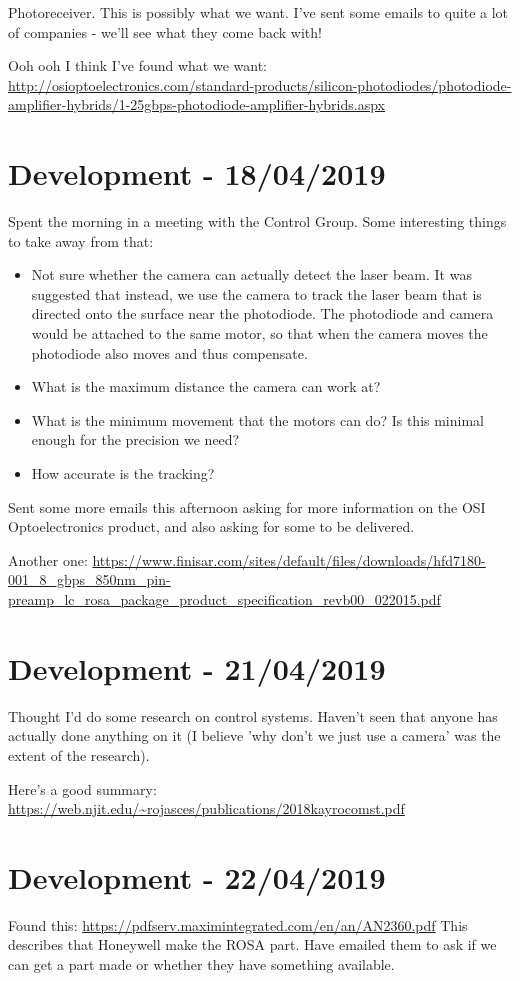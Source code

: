 Photoreceiver. This is possibly what we want. I've sent some emails to quite
a lot of companies - we'll see what they come back with!

Ooh ooh I think I've found what we want:
\url{http://osioptoelectronics.com/standard-products/silicon-photodiodes/photodiode-amplifier-hybrids/1-25gbps-photodiode-amplifier-hybrids.aspx}

\section{Development - 18/04/2019}
Spent the morning in a meeting with the Control Group. Some interesting things
to take away from that:

\begin{itemize}
\item{Not sure whether the camera can actually detect the laser beam. It was
suggested that instead, we use the camera to track the laser beam that is
directed onto the surface near the photodiode. The photodiode and camera would
be attached to the same motor, so that when the camera moves the photodiode
also moves and thus compensate.}
\item{What is the maximum distance the camera can work at?}
\item{What is the minimum movement that the motors can do? Is this minimal
enough for the precision we need?}
\item{How accurate is the tracking?}
\end{itemize}

Sent some more emails this afternoon asking for more information on the
OSI Optoelectronics product, and also asking for some to be delivered.

Another one:
\url{https://www.finisar.com/sites/default/files/downloads/hfd7180-001_8_gbps_850nm_pin-preamp_lc_rosa_package_product_specification_revb00_022015.pdf}

\section{Development - 21/04/2019}
Thought I'd do some research on control systems. Haven't seen that anyone
has actually done anything on it (I believe 'why don't we just use a camera'
was the extent of the research).

Here's a good summary:
\url{https://web.njit.edu/~rojasces/publications/2018kayrocomst.pdf}

\section{Development - 22/04/2019}
Found this:
\url{https://pdfserv.maximintegrated.com/en/an/AN2360.pdf}
This describes that Honeywell make the ROSA part. Have emailed them to ask if
we can get a part made or whether they have something available.

